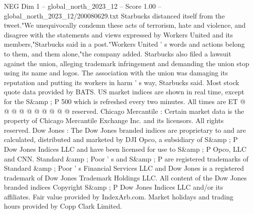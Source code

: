 \begin{textsample}{NEG Dim 1 – global\_north\_2023\_12 – Score 1.00 – global\_north\_2023\_12/200080629.txt}
Starbucks distanced itself from the tweet."We unequivocally condemn these acts of terrorism, hate and violence, and disagree with the statements and views expressed by Workers United and its members,"Starbucks said in a post."Workers United ' s words and actions belong to them, and them alone,"the company added.
Starbucks also filed a lawsuit against the union, alleging trademark infringement and demanding the union stop using its name and logos.
The association with the union was damaging its reputation and putting its workers in harm ' s way, Starbucks said.
Most stock quote data provided by BATS.
US market indices are shown in real time, except for the S\&amp ; P 500 which is refreshed every two minutes.
All times are ET @ @ @ @ @ @ @ @ @ @ reserved.
Chicago Mercantile : Certain market data is the property of Chicago Mercantile Exchange Inc. and its licensors.
All rights reserved.
Dow Jones : The Dow Jones branded indices are proprietary to and are calculated, distributed and marketed by DJI Opco, a subsidiary of S\&amp ; P Dow Jones Indices LLC and have been licensed for use to S\&amp ; P Opco, LLC and CNN.
Standard \&amp ; Poor ' s and S\&amp ; P are registered trademarks of Standard \&amp ; Poor ' s Financial Services LLC and Dow Jones is a registered trademark of Dow Jones Trademark Holdings LLC.
All content of the Dow Jones branded indices Copyright S\&amp ; P Dow Jones Indices LLC and/or its affiliates.
Fair value provided by IndexArb.com.
Market holidays and trading hours provided by Copp Clark Limited.

\end{textsample}
